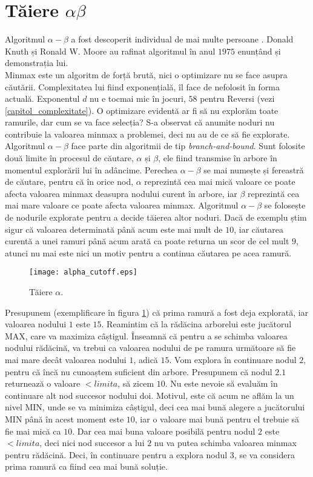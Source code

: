 \documentclass[12pt,twoside,a4paper,fleqn]{book}
\theoremstyle{definition}
\begin{document}
\section{Tăiere $\alpha \beta$}
Algoritmul $\alpha-\beta$ a fost descoperit individual de mai multe persoane \cite{brokington}. Donald Knuth și Ronald W. Moore au rafinat algoritmul în anul $1975$ enunțând și demonstrația lui.\\
Minmax este un algoritm de forță brută, nici o optimizare nu se face asupra căutării. Complexitatea lui fiind exponențială, îl face de nefolosit în forma actuală. Exponentul $d$ nu e tocmai mic în jocuri, $58$ pentru Reversi (vezi \ref{capitol_complexitate}). O optimizare evidentă ar fi să nu explorăm toate ramurile, dar cum se va face selecția? S-a observat că anumite noduri nu contribuie la valoarea minmax a problemei, deci nu au de ce să fie explorate. Algoritmul $\alpha-\beta$ face parte din algoritmii de tip \emph{branch-and-bound}. Sunt folosite două limite în procesul de căutare, $\alpha$ și $\beta$, ele fiind transmise în arbore în momentul explorării lui în adâncime. Perechea $\alpha-\beta$ se mai numește și fereastră de căutare, pentru că în orice nod, $\alpha$ reprezintă cea mai mică valoare ce poate afecta valoarea minmax deasupra nodului curent în arbore, iar $\beta$ reprezintă cea mai mare valoare ce poate afecta valoarea minmax. Algoritmul $\alpha-\beta$ se folosește de nodurile explorate pentru a decide tăierea altor noduri. Dacă de exemplu știm sigur că valoarea determinată până acum este mai mult de $10$, iar căutarea curentă a unei ramuri până acum arată ca poate returna un scor de cel mult $9$, atunci nu mai este nici un motiv pentru a continua căutarea pe acea ramură.

\begin{figure}[h]
\begin{center}
\texttt{[image: alpha\_cutoff.eps]}
\caption{\small{Tăiere $\alpha$.}}
\label{fig:alpha_cutoff}
\end{center}
\end{figure}

Presupunem (exemplificare în figura \ref{fig:alpha_cutoff}) că prima ramură a fost deja explorată, iar valoarea nodului $1$ este $15$. Reamintim că la rădăcina arborelui este jucătorul MAX, care va maximiza câștigul. Înseamnă că pentru a se schimba valoarea nodului rădăcină, va trebui ca valoarea nodului de pe ramura următoare să fie mai mare decât valoarea nodului $1$, adică $15$. Vom explora în continuare nodul $2$, pentru că încă nu cunoaștem suficient din arbore. Presupunem că nodul $2.1$ returnează o valoare $< limita$, să zicem $10$. Nu este nevoie să evaluăm în continuare alt nod succesor nodului doi. Motivul, este că acum ne aflăm la un nivel MIN, unde se va minimiza câștigul, deci cea mai bună alegere a jucătorului MIN până în acest moment este $10$, iar o valoare mai bună pentru el trebuie să fie mai mică ca $10$. Dar cea mai buna valoare posibilă pentru nodul $2$ este $< limita$, deci nici nod succesor a lui $2$ nu va putea schimba valoarea minmax pentru rădăcină. Deci, în continuare pentru a explora nodul $3$, se va considera prima ramură ca fiind cea mai bună soluție.\\
\end{document}
